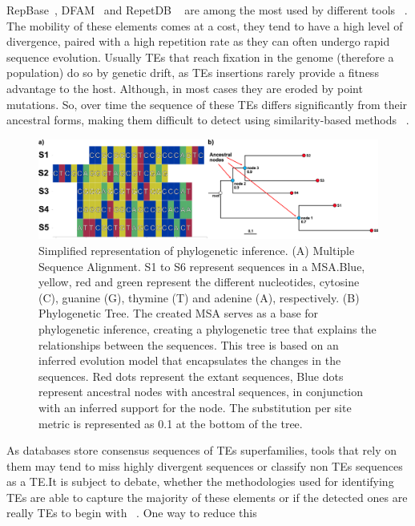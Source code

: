 \documentclass[unnumsec,webpdf,contemporary,large]{oup-authoring-template}%
\theoremstyle{thmstyleone}%
\theoremstyle{thmstyletwo}%
\theoremstyle{thmstylethree}%
\begin{document}
RepBase~\cite{bao_repbase_2015}, DFAM~\cite{storer_dfam_2021} and RepetDB
~\cite{amselem_repetdb_2019} are among the most used by different tools
~\cite{branco_overview_2023, flynn_repeatmodeler2_2020}. The mobility of these
elements comes at a cost, they tend to have a high level of divergence, paired
with a high repetition rate as they can often undergo rapid sequence evolution.
Usually TEs that reach fixation in the genome (therefore a population) do so by
genetic drift, as TEs insertions rarely provide a fitness advantage to the host.
Although, in most cases they are eroded by point mutations. So, over time the
sequence of these TEs differs significantly from their ancestral forms, making
them difficult to detect using similarity-based methods
~\cite{feschotte_dna_2007, bourque_ten_2018}.
\begin{figure}[!t]
\centering
\includegraphics[width=\textwidth]{figs/fig1_phylo_tree.eps}
\caption{Simplified representation of phylogenetic inference. (A) Multiple
Sequence Alignment. S1 to S6 represent sequences in a MSA.\@ Blue, yellow, red
and green represent the different nucleotides, cytosine (C), guanine (G),
thymine (T) and adenine (A), respectively. (B) Phylogenetic Tree. The created
MSA serves as a base for phylogenetic inference, creating a phylogenetic tree
that explains the relationships between the sequences. This tree is based on an
inferred evolution model that encapsulates the changes in the sequences. Red
dots represent the extant sequences, Blue dots represent ancestral nodes with
ancestral sequences, in conjunction with an inferred support for the node. The
substitution per site metric is represented as 0.1 at the bottom of the
tree.}\label{fig:image1}
\end{figure}
As databases store consensus sequences of TEs superfamilies, tools that rely on
them may tend to miss highly divergent sequences or classify non TEs sequences
as a TE.\@  It is subject to debate, whether the methodologies used for
identifying TEs are able to capture the majority of these elements or if the
detected ones are really TEs to begin with
~\cite{feschotte_dna_2007,branco_transposable_2023}. One way to reduce this
\end{document}
